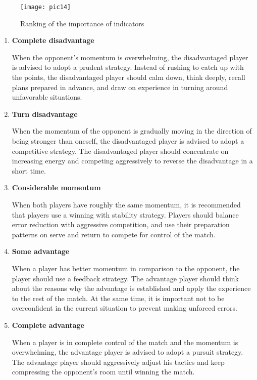 \documentclass[12pt]{article}  %
\begin{document}
\begin{figure}[htbp]  %
	\centering  %
	\texttt{[image: pic14]} %
	\caption{Ranking of the importance of indicators}  
	\label{pic14}
\end{figure}
\vspace{-0.5cm}

\begin{enumerate}[\bfseries 1.]
	\setlength{\parsep}{0ex} %
	\setlength{\topsep}{0.5pt} %
	\setlength{\itemsep}{0.5pt} %
	\item \textbf{Complete disadvantage}
	
	When the opponent's momentum is overwhelming, the disadvantaged player is advised to adopt a prudent strategy. Instead of rushing to catch up with the points, the disadvantaged player should calm down, think deeply, recall plans prepared in advance, and draw on experience in turning around unfavorable situations.
	\item \textbf{Turn disadvantage}
	
	When the momentum of the opponent is gradually moving in the direction of being stronger than oneself, the disadvantaged player is advised to adopt a competitive strategy. The disadvantaged player should concentrate on increasing energy and competing aggressively to reverse the disadvantage in a short time.
	\item \textbf{Considerable momentum}
	
	When both players have roughly the same momentum, it is recommended that players use a winning with stability strategy. Players should balance error reduction with aggressive competition, and use their preparation patterns on serve and return to compete for control of the match.
	\item \textbf{Some advantage}
	
	When a player has better momentum in comparison to the opponent, the player should use a feedback strategy. The advantage player should think about the reasons why the advantage is established and apply the experience to the rest of the match. At the same time, it is important not to be overconfident in the current situation to prevent making unforced errors.
	\item \textbf{Complete advantage}
	
	When a player is in complete control of the match and the momentum is overwhelming, the advantage player is advised to adopt a pursuit strategy. The advantage player should aggressively adjust his tactics and keep compressing the opponent's room until winning the match.
\end{enumerate}
\end{document}
